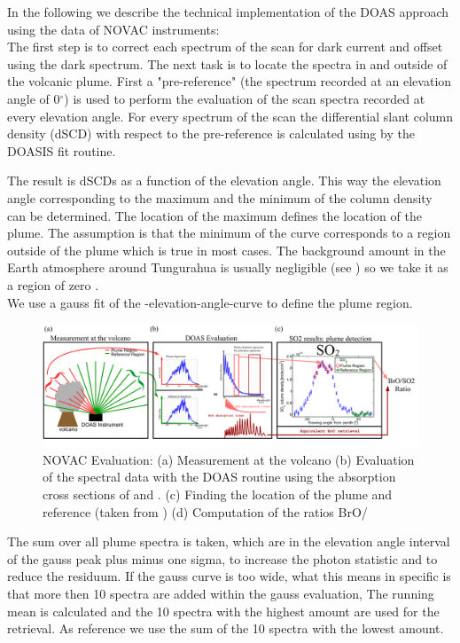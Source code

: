 %
In the following we describe the technical implementation of the DOAS approach using the data of NOVAC instruments:\\
%
The first step is to correct each spectrum of the scan for dark current and offset using the dark spectrum.
The next task is to locate the spectra in and outside of the volcanic plume.
First a "pre-reference" (the spectrum recorded at an elevation angle of  0$^{\circ} $) is used to perform the evaluation of the scan spectra recorded at every elevation angle.
For every spectrum of the scan the  differential slant column density (dSCD) with respect to the pre-reference is calculated using  by the DOASIS fit routine.

The result is  dSCDs as a function of the elevation angle. This way the elevation angle corresponding to the maximum and the minimum of the  column density can be determined. The location of the  maximum defines the location of the plume. The assumption is that the minimum of the  curve corresponds to a region outside of the plume which is true in most cases. The background  amount in the Earth atmosphere around Tungurahua is usually negligible (see  ) so we take it as a region of zero . \\
We use a gauss fit of the -elevation-angle-curve to define the plume region.
%
\begin{figure}
	\centering
	\includegraphics[width=1\linewidth]{Bilder/NOVAC_Eval}
	\caption{NOVAC Evaluation: (a) Measurement at the volcano (b) Evaluation of the spectral data with the DOAS routine using the absorption cross sections of   and . (c) Finding the location of the plume and reference (taken from \cite{WarnachSimon}) (d) Computation of the ratios BrO/}
	\label{fig:NOVAC_Eval}
\end{figure}
The sum over all plume spectra is taken, which are in the elevation angle interval of the gauss peak plus minus one sigma, to increase the photon statistic and to reduce the residuum. If the gauss curve is too wide, what this means in specific is that more then 10 spectra are added within the gauss evaluation, The running mean is calculated and the 10 spectra with the highest  amount are used for the retrieval. As reference we use the sum of the 10 spectra with the lowest  amount.\\

